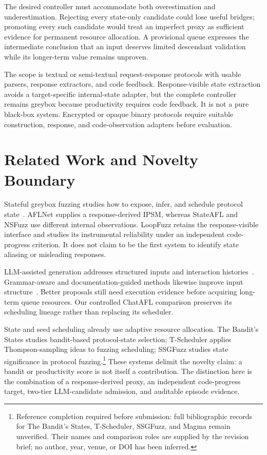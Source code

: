 \documentclass[final,5p,times,number]{elsarticle}
\begin{document}
The desired controller must accommodate both overestimation and underestimation. Rejecting every state-only candidate could lose useful bridges; promoting every such candidate would treat an imperfect proxy as sufficient evidence for permanent resource allocation. A provisional queue expresses the intermediate conclusion that an input deserves limited descendant validation while its longer-term value remains unproven.

The scope is textual or semi-textual request-response protocols with usable parsers, response extractors, and code feedback. Response-visible state extraction avoids a target-specific internal-state adapter, but the complete controller remains greybox because productivity requires code feedback. It is not a pure black-box system. Encrypted or opaque binary protocols require suitable construction, response, and code-observation adapters before evaluation.

\section{Related Work and Novelty Boundary}
Stateful greybox fuzzing studies how to expose, infer, and schedule protocol state~\cite{aflnet,stateafl,nsfuzz,sgf_usenix22}. AFLNet supplies a response-derived IPSM, whereas StateAFL and NSFuzz use different internal observations. LoopFuzz retains the response-visible interface and studies its instrumental reliability under an independent code-progress criterion. It does not claim to be the first system to identify state aliasing or misleading responses.

LLM-assisted generation addresses structured inputs and interaction histories~\cite{chatafl,fuzz4all_universal_fuzzing_large_2024,llmif_augmented_large_language_2024}. Grammar-aware and documentation-guided methods likewise improve input structure~\cite{gramatron_effective_grammar_aware_2021,carpetfuzz_documentation_2023}. Better proposals still need execution evidence before acquiring long-term queue resources. Our controlled ChatAFL comparison preserves its scheduling lineage rather than replacing its scheduler.

State and seed scheduling already use adaptive resource allocation. The Bandit's States studies bandit-based protocol-state selection; T-Scheduler applies Thompson-sampling ideas to fuzzing scheduling; SSGFuzz studies state significance in protocol fuzzing.\footnote{Reference completion required before submission: full bibliographic records for The Bandit's States, T-Scheduler, SSGFuzz, and Magma remain unverified. Their names and comparison roles are supplied by the revision brief; no author, year, venue, or DOI has been inferred.} These systems delimit the novelty claim: a bandit or productivity score is not itself a contribution. The distinction here is the combination of a response-derived proxy, an independent code-progress target, two-tier LLM-candidate admission, and auditable episode evidence.
\end{document}
